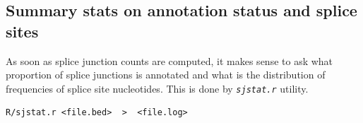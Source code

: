 \documentclass{article}
\newcommand{\prog}[1]{{\tt\em #1}}
\begin{document}
\subsection{Summary stats on annotation status and splice sites}
As soon as splice junction counts are computed, it makes sense to ask what proportion of splice junctions is annotated and what is the distribution of
frequencies of splice site nucleotides. This is done by \prog{sjstat.r} utility.
\begin{verbatim}
R/sjstat.r <file.bed>  >  <file.log>
\end{verbatim}





\end{document}
